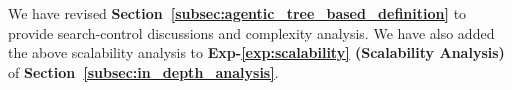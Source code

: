 We have revised \textbf{Section~\ref{subsec:agentic_tree_based_definition}} to provide search-control discussions and complexity analysis. We have also added the above scalability analysis to \textbf{Exp-\ref{exp:scalability} (Scalability Analysis)} of \textbf{Section~\ref{subsec:in_depth_analysis}}. 


%
%
